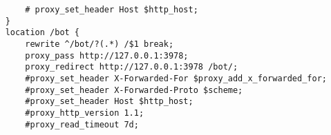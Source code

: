 \documentclass{article}
\begin{document}
\begin{verbatim}
        # proxy_set_header Host $http_host;                                                                                                                                                                                                                   
    }                                                                                                                                                                                                                                                         
    location /bot {                                                                                                                                                                                                                                           
        rewrite ^/bot/?(.*) /$1 break;                                                                                                                                                                                                                        
        proxy_pass http://127.0.0.1:3978;                                                                                                                                                                                                                     
        proxy_redirect http://127.0.0.1:3978 /bot/;                                                                                                                                                                                                           
        #proxy_set_header X-Forwarded-For $proxy_add_x_forwarded_for;                                                                                                                                                                                         
        #proxy_set_header X-Forwarded-Proto $scheme;                                                                                                                                                                                                          
        #proxy_set_header Host $http_host;                                                                                                                                                                                                                    
        #proxy_http_version 1.1;                                                                                                                                                                                                                              
        #proxy_read_timeout 7d;                                                                                                                                                                                                                               

\end{verbatim}
\end{document}
